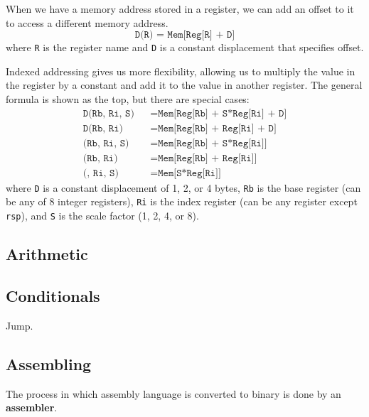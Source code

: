   \begin{definition}
    When we have a memory address stored in a register, we can add an offset to it to access a different memory address. 
    \begin{equation}
      \texttt{D(R) = Mem[Reg[R] + D]}
    \end{equation}
    where \texttt{R} is the register name and \texttt{D} is a constant displacement that specifies offset. 
  \end{definition}

  \begin{definition}
    Indexed addressing gives us more flexibility, allowing us to multiply the value in the register by a constant and add it to the value in another register. The general formula is shown as the top, but there are special cases: 
    \begin{align*}
      \texttt{D(Rb, Ri, S)} && = \texttt{Mem[Reg[Rb] + S*Reg[Ri] + D]} \\ 
      \texttt{D(Rb, Ri)} && = \texttt{Mem[Reg[Rb] + Reg[Ri] + D]} \\
      \texttt{(Rb, Ri, S)} && = \texttt{Mem[Reg[Rb] + S*Reg[Ri]]} \\ 
      \texttt{(Rb, Ri)} && = \texttt{Mem[Reg[Rb] + Reg[Ri]]} \\
      \texttt{(, Ri, S)} && = \texttt{Mem[S*Reg[Ri]]} 
    \end{align*}
    where \texttt{D} is a constant displacement of 1, 2, or 4 bytes, \texttt{Rb} is the base register (can be any of 8 integer registers), \texttt{Ri} is the index register (can be any register except \texttt{rsp}), and \texttt{S} is the scale factor (1, 2, 4, or 8). 
  \end{definition}

\subsection{Arithmetic}

\subsection{Conditionals} 

  Jump. 

\subsection{Assembling}

  The process in which assembly language is converted to binary is done by an \textbf{assembler}. 

